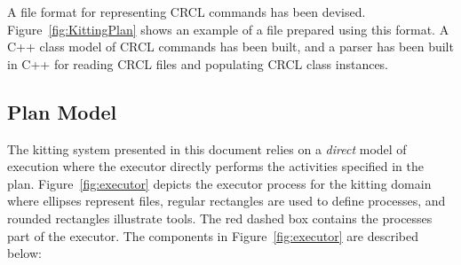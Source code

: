 A file format for representing CRCL commands has been devised.
Figure~\ref{fig:KittingPlan} shows an example of a file prepared using this
format. A C++ class model of CRCL commands has been built, and a parser has
been built in C++ for reading CRCL files and populating
CRCL class instances.

\subsection{Plan Model}
The kitting system presented in this document relies on a \textit{direct} model of execution where the executor directly performs the activities specified in the plan. Figure~\ref{fig:executor} depicts the executor process for the kitting domain where ellipses represent files, regular rectangles are used to define processes, and rounded rectangles illustrate tools. The red dashed box contains the processes part of the executor. The components in Figure~\ref{fig:executor} are described below:

